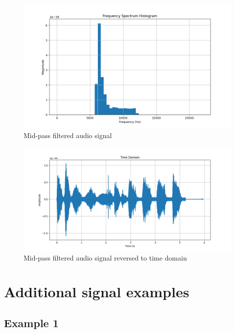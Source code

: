 \documentclass[a4paper,12pt,fleqn]{article}
\begin{document}
\begin{figure}[H]
    \centering
    \includegraphics[width=1\textwidth]{mid_pass_filter.png}
    \caption{Mid-pass filtered audio signal}
    \label{fig:mid_pass_filter}
\end{figure}

\begin{figure}[H]
    \centering
    \includegraphics[width=1\textwidth]{mid_pass_filter_time.png}
    \caption{Mid-pass filtered audio signal reversed to time domain}
    \label{fig:mid_pass_filter_histogram}
\end{figure}

\newpage
\section{Additional signal examples}

\subsection{Example 1}
\end{document}
